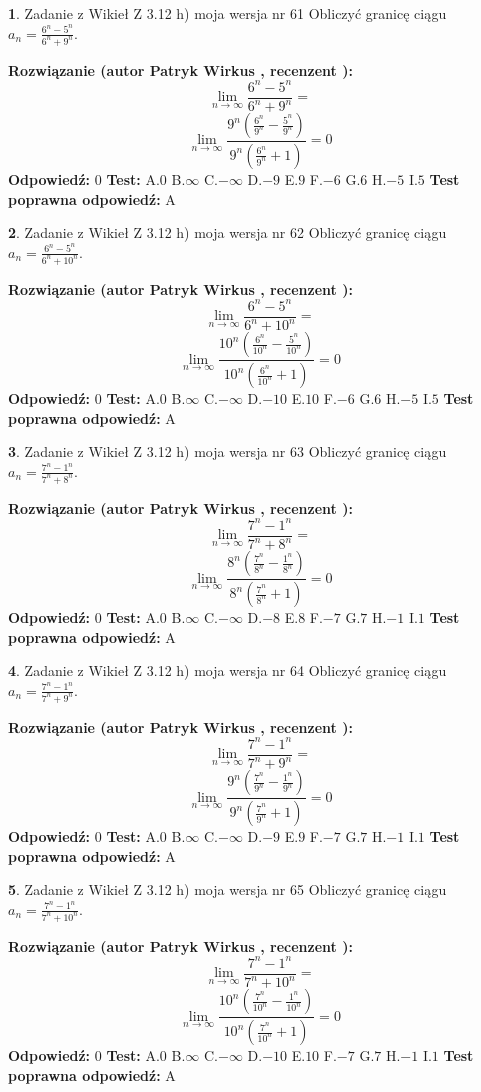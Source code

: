 \documentclass[12pt, a4paper]{article}
\theoremstyle{definition} %
\newtheorem{zad}{}
\newcommand{\zadStart}[1]{\begin{zad}#1\newline}
\newcommand{\zadStop}{\end{zad}}
\newcommand{\rozwStart}[2]{\noindent \textbf{Rozwiązanie (autor #1 , recenzent #2): }\newline}
\newcommand{\rozwStop}{\newline}
\newcommand{\odpStart}{\noindent \textbf{Odpowiedź:}\newline}
\newcommand{\odpStop}{\newline}
\newcommand{\testStart}{\noindent \textbf{Test:}\newline}
\newcommand{\testStop}{\newline}
\newcommand{\kluczStart}{\noindent \textbf{Test poprawna odpowiedź:}\newline}
\newcommand{\kluczStop}{\newline}
\begin{document}
\zadStart{Zadanie z Wikieł Z 3.12 h) moja wersja nr 61}
Obliczyć granicę ciągu $a_{n}=\frac{6^{n} - 5^{n}}{6^{n} + 9^{n}}$.
\zadStop
\rozwStart{Patryk Wirkus}{}
$$\lim\limits_{n\to\infty}\frac{6^{n} - 5^{n}}{6^{n} + 9^{n}}=$$
$$\lim\limits_{n\to\infty}\frac{9^{n}(\frac{6^{n}}{9^{n}} - \frac{5^{n}}{9^{n}})}{9^{n}(\frac{6^{n}}{9^{n}} + 1)} = 0$$
\rozwStop
\odpStart
$0$
\odpStop
\testStart
A.$0$
B.$\infty$
C.$-\infty$
D.$-9$
E.$9$
F.$-6$
G.$6$
H.$-5$
I.$5$
\testStop
\kluczStart
A
\kluczStop



\zadStart{Zadanie z Wikieł Z 3.12 h) moja wersja nr 62}
Obliczyć granicę ciągu $a_{n}=\frac{6^{n} - 5^{n}}{6^{n} + 10^{n}}$.
\zadStop
\rozwStart{Patryk Wirkus}{}
$$\lim\limits_{n\to\infty}\frac{6^{n} - 5^{n}}{6^{n} + 10^{n}}=$$
$$\lim\limits_{n\to\infty}\frac{10^{n}(\frac{6^{n}}{10^{n}} - \frac{5^{n}}{10^{n}})}{10^{n}(\frac{6^{n}}{10^{n}} + 1)} = 0$$
\rozwStop
\odpStart
$0$
\odpStop
\testStart
A.$0$
B.$\infty$
C.$-\infty$
D.$-10$
E.$10$
F.$-6$
G.$6$
H.$-5$
I.$5$
\testStop
\kluczStart
A
\kluczStop



\zadStart{Zadanie z Wikieł Z 3.12 h) moja wersja nr 63}
Obliczyć granicę ciągu $a_{n}=\frac{7^{n} - 1^{n}}{7^{n} + 8^{n}}$.
\zadStop
\rozwStart{Patryk Wirkus}{}
$$\lim\limits_{n\to\infty}\frac{7^{n} - 1^{n}}{7^{n} + 8^{n}}=$$
$$\lim\limits_{n\to\infty}\frac{8^{n}(\frac{7^{n}}{8^{n}} - \frac{1^{n}}{8^{n}})}{8^{n}(\frac{7^{n}}{8^{n}} + 1)} = 0$$
\rozwStop
\odpStart
$0$
\odpStop
\testStart
A.$0$
B.$\infty$
C.$-\infty$
D.$-8$
E.$8$
F.$-7$
G.$7$
H.$-1$
I.$1$
\testStop
\kluczStart
A
\kluczStop



\zadStart{Zadanie z Wikieł Z 3.12 h) moja wersja nr 64}
Obliczyć granicę ciągu $a_{n}=\frac{7^{n} - 1^{n}}{7^{n} + 9^{n}}$.
\zadStop
\rozwStart{Patryk Wirkus}{}
$$\lim\limits_{n\to\infty}\frac{7^{n} - 1^{n}}{7^{n} + 9^{n}}=$$
$$\lim\limits_{n\to\infty}\frac{9^{n}(\frac{7^{n}}{9^{n}} - \frac{1^{n}}{9^{n}})}{9^{n}(\frac{7^{n}}{9^{n}} + 1)} = 0$$
\rozwStop
\odpStart
$0$
\odpStop
\testStart
A.$0$
B.$\infty$
C.$-\infty$
D.$-9$
E.$9$
F.$-7$
G.$7$
H.$-1$
I.$1$
\testStop
\kluczStart
A
\kluczStop



\zadStart{Zadanie z Wikieł Z 3.12 h) moja wersja nr 65}
Obliczyć granicę ciągu $a_{n}=\frac{7^{n} - 1^{n}}{7^{n} + 10^{n}}$.
\zadStop
\rozwStart{Patryk Wirkus}{}
$$\lim\limits_{n\to\infty}\frac{7^{n} - 1^{n}}{7^{n} + 10^{n}}=$$
$$\lim\limits_{n\to\infty}\frac{10^{n}(\frac{7^{n}}{10^{n}} - \frac{1^{n}}{10^{n}})}{10^{n}(\frac{7^{n}}{10^{n}} + 1)} = 0$$
\rozwStop
\odpStart
$0$
\odpStop
\testStart
A.$0$
B.$\infty$
C.$-\infty$
D.$-10$
E.$10$
F.$-7$
G.$7$
H.$-1$
I.$1$
\testStop
\kluczStart
A
\kluczStop
\end{document}
